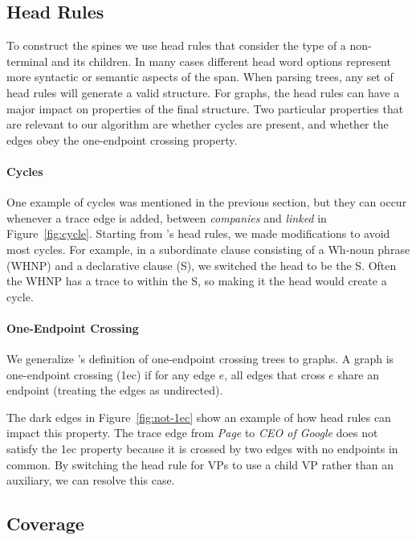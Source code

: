 \subsection{Head Rules}

To construct the spines we use head rules that consider the type of a non-terminal and its children.
In many cases different head word options represent more syntactic or semantic aspects of the span.
When parsing trees, any set of head rules will generate a valid structure.
For graphs, the head rules can have a major impact on properties of the final structure.
Two particular properties that are relevant to our algorithm are whether cycles are present, and whether the edges obey the one-endpoint crossing property.

\paragraph{Cycles}
One example of cycles was mentioned in the previous section, but they can occur whenever a trace edge is added, \myeg between \emph{companies} and \emph{linked} in Figure~\ref{fig:cycle}.
Starting from \textcite{cck}'s head rules, we made modifications to avoid most cycles.
For example, in a subordinate clause consisting of a Wh-noun phrase (WHNP) and a declarative clause (S), we switched the head to be the S.
Often the WHNP has a trace to within the S, so making it the head would create a cycle.

\paragraph{One-Endpoint Crossing}
We generalize \textcite{ec}'s definition of one-endpoint crossing trees to graphs.
A graph is one-endpoint crossing (1ec) if for any edge $e$, all edges that cross $e$ share an endpoint (treating the edges as undirected).

The dark edges in Figure~\ref{fig:not-1ec} show an example of how head rules can impact this property.
The trace edge from \emph{Page} to \emph{CEO of Google} does not satisfy the 1ec property because it is crossed by two edges with no endpoints in common.
By switching the head rule for VPs to use a child VP rather than an auxiliary, we can resolve this case.

\subsection{Coverage}

